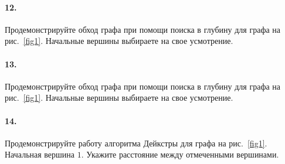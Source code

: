 \documentclass[12pt, twoside]{article}
\begin{document}
\paragraph{12.} Продемонстрируйте обход графа при помощи поиска в глубину для графа на рис.~\ref{fig1}. Начальные вершины выбираете на свое усмотрение.

\paragraph{13.} Продемонстрируйте обход графа при помощи поиска в глубину для графа на рис.~\ref{fig1}. Начальные вершины выбираете на свое усмотрение.


\paragraph{14.} Продемонстрируйте работу алгоритма Дейкстры для графа на рис.~\ref{fig1}. Начальная вершина $1$. Укажите расстояние между отмеченными вершинами.
\end{document}
